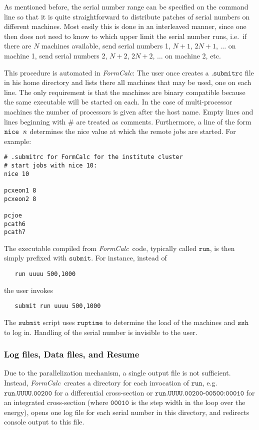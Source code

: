 \documentclass[twoside,11pt]{article}
\makeatletter
\def\indextt#1{\index{#1@\texttt{#1}}}
\def\FC{\textit{FormCalc}}
\def\Var#1{\ensuremath{\mathit{#1}}}
\def\Code#1{\ensuremath{\texttt{#1}}}
\def\ie{i.e.\ }
\def\eg{e.g.\ }
\makeatother
\begin{document}
As mentioned before, the serial number range can be specified on the 
command line so that it is quite straightforward to distribute patches 
of serial numbers on different machines.  Most easily this is done in an 
interleaved manner, since one then does not need to know to which upper 
limit the serial number runs, \ie if there are $N$ machines available, 
send serial numbers 1, $N + 1$, $2N + 1$, $\dots$ on machine 1, send 
serial numbers 2, $N + 2$, $2N + 2$, $\dots$ on machine 2, etc.

This procedure is automated in \FC: The user once creates a 
\Code{.submitrc} file in his home directory and lists there all machines 
that may be used, one on each line.  The only requirement is that the 
machines are binary compatible because the same executable will be 
started on each.  In the case of multi-processor machines the number of 
processors is given after the host name.  Empty lines and lines 
beginning with \Code{\#} are treated as comments.  Furthermore, a line 
of the form \Code{nice \Var{n}} determines the nice value at which the 
remote jobs are started.  For example:
\begin{verbatim}
# .submitrc for FormCalc for the institute cluster
# start jobs with nice 10:
nice 10

pcxeon1 8
pcxeon2 8

pcjoe
pcath6
pcath7
\end{verbatim}
The executable compiled from \FC\ code, typically called \Code{run},
is then simply prefixed with \Code{submit}.  For instance, instead of
\begin{verbatim}
   run uuuu 500,1000
\end{verbatim}
the user invokes
\begin{verbatim}
   submit run uuuu 500,1000
\end{verbatim}
The \Code{submit} script uses \Code{ruptime} to determine the load
of the machines and \Code{ssh} to log in.  Handling of the serial
number is invisible to the user.%
\indextt{submit}
\indextt{.submitrc}


\subsubsection{Log files, Data files, and Resume}
%
%

Due to the parallelization mechanism, a single output file is not
sufficient.  Instead, \FC\ creates a directory for each invocation of
\Code{run}, \eg \Code{run.UUUU.00200} for a differential cross-section
or \Code{run.UUUU.00200-00500:00010} for an integrated cross-section 
(where \Code{00010} is the step width in the loop over the energy),
opens one log file for each serial number in this directory, and
redirects console output to this file.%
\end{document}
